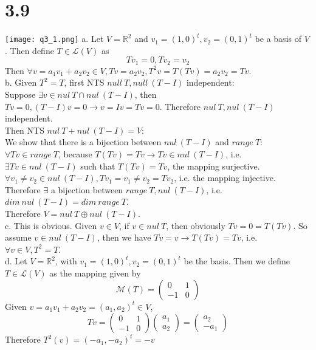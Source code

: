 \documentclass{article}
\begin{document}
\section{3.9}
\texttt{[image: q3\_1.png]}
a. Let $V = \mathbb{R}^2$ and $v_1 = (1, 0)^t, v_2 = (0, 1)^t$ be a basis of $V$. Then define $T \in \mathcal{L}(V)$ as
\begin{equation*}
    Tv_1 = 0, Tv_2 = v_2
\end{equation*}
Then $\forall v = a_1v_1 + a_2v_2 \in V, Tv = a_2v_2, T^2v = T(Tv) = a_2v_2 = Tv$.\\
b. Given $T^2 = T$, first NTS $null\ T, null\ (T-I)$ independent:\\
Suppose $\exists v \in nul\ T \cap nul\ (T-I)$, then $Tv = 0, (T-I)v = 0 \rightarrow v = Iv = Tv = 0$. Therefore $nul\ T, nul\ (T-I)$ independent.\\
Then NTS $nul\ T + nul\ (T-I) = V$:\\
We show that there is a bijection between $nul\ (T-I)$ and $range\ T$:\\
$\forall Tv \in range\ T$, because $T(Tv) = Tv \rightarrow Tv \in nul\ (T-I)$, i.e. $\exists Tv \in nul\ (T-I)$ such that $T(Tv) = Tv$, the mapping surjective.\\
$\forall v_1 \neq v_2 \in nul\ (T-I), Tv_1 = v_1 \neq v_2 = Tv_2$, i.e. the mapping injective.\\
Therefore $\exists$ a bijection between $range\ T, nul\ (T-I)$, i.e. $dim\ nul\ (T-I) = dim\ range\ T$.\\
Therefore $V = nul\ T \oplus nul\ (T-I)$.\\
c. This is obvious. Given $v \in V$, if $v \in nul\ T$, then obviously $Tv = 0 = T(Tv)$. So assume $v \in nul\ (T-I)$, then we have $Tv = v \rightarrow T(Tv) = Tv$, i.e. $\forall v \in V, T^2 = T$.\\
d. Let $V = \mathbb{R}^2$, with $v_1 = (1, 0)^t, v_2 = (0, 1)^t$ be the basis. Then we define $T \in \mathcal{L}(V)$ as the mapping given by
\begin{equation*}
    \mathcal{M}(T) = \begin{pmatrix}
    0 & 1\\
    -1 & 0
    \end{pmatrix}
\end{equation*}
Given $v = a_1v_1 + a_2v_2 = (a_1, a_2)^t \in V$,
\begin{equation*}
    Tv = \begin{pmatrix}
    0 & 1\\
    -1 & 0
    \end{pmatrix}
    \begin{pmatrix}
    a_1\\
    a_2
    \end{pmatrix} = 
    \begin{pmatrix}
    a_2\\
    -a_1
    \end{pmatrix}
\end{equation*}
Therefore $T^2(v) = (-a_1, -a_2)^t = -v$
\end{document}
